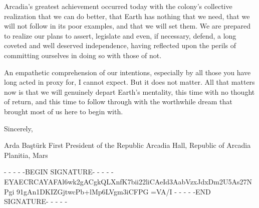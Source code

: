 Arcadia's greatest achievement occurred today with the colony's collective realization that we can do better, that Earth has nothing that we need, that we will not follow in its poor examples, and that we will set them. We are prepared to realize our plans to assert, legislate and even, if necessary, defend, a long coveted and well deserved independence, having reflected upon the perils of committing ourselves in doing so with those of not. 

An empathetic comprehension of our intentions, especially by all those you have long acted in proxy for, I cannot expect. But it does not matter. All that matters now is that we will genuinely depart Earth's mentality, this time with no thought of return, and this time to follow through with the worthwhile dream that brought most of us here to begin with.

Sincerely, 

\hskip 1cm 
   
Arda Baştürk
First President of the Republic
Arcadia Hall, Republic of Arcadia Planitia, Mars

- - - - -BEGIN SIGNATURE- - - - -
EYAECRCAYAFAl6wk2gACgkQLXnfK7bii22liCAeId3AabVzxJdxDm2U5As27NPgi
91gAn1DKIZGjtwcPb+lMp6LVgm3iCFPG
=VA/I
- - - - -END SIGNATURE- - - - -
\stoplines

